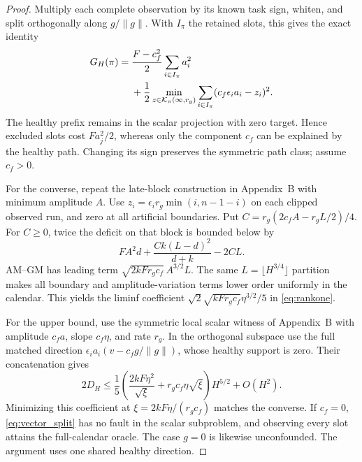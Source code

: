 \begin{proof}
Multiply each complete observation by its known task sign, whiten, and split orthogonally along $g/\|g\|$. With $I_\pi$ the retained slots, this gives the exact identity
\begin{align}
G_H(\pi)={}&\frac{F-c_f^2}{2}\sum_{i\in I_\pi}a_i^2\nonumber\\
&+\frac12\min_{z\in\mathcal K_\pi(\infty,r_g)}\sum_{i\in I_\pi}(c_f\epsilon_i a_i-z_i)^2.\label{eq:vector_split}
\end{align}
The healthy prefix remains in the scalar projection with zero target. Hence excluded slots cost $Fa_j^2/2$, whereas only the component $c_f$ can be explained by the healthy path. Changing its sign preserves the symmetric path class; assume $c_f>0$.

For the converse, repeat the late-block construction in Appendix~B with minimum amplitude $A$. Use $z_i=\epsilon_i r_g\min(i,n-1-i)$ on each clipped observed run, and zero at all artificial boundaries. Put $C=r_g(2c_f A-r_gL/2)/4$. For $C\ge0$, twice the deficit on that block is bounded below by
\begin{equation}
 FA^2d+\frac{Ck(L-d)^2}{d+k}-2CL.
\end{equation}
AM--GM has leading term $\sqrt{2kF r_gc_f}\,A^{3/2}L$. The same $L=\lfloor H^{3/4}\rfloor$ partition makes all boundary and amplitude-variation terms lower order uniformly in the calendar. This yields the liminf coefficient $\sqrt2\sqrt{kF r_gc_f}\eta^{3/2}/5$ in \eqref{eq:rankone}.

For the upper bound, use the symmetric local scalar witness of Appendix~B with amplitude $c_f a$, slope $c_f\eta$, and rate $r_g$. In the orthogonal subspace use the full matched direction $\epsilon_i a_i(v-c_fg/\|g\|)$, whose healthy support is zero. Their concatenation gives
\begin{equation}
2D_H\le\frac15\left(\frac{2kF\eta^2}{\sqrt\xi}+r_gc_f\eta\sqrt\xi\right)H^{5/2}+O(H^2).
\end{equation}
Minimizing this coefficient at $\xi=2kF\eta/(r_gc_f)$ matches the converse. If $c_f=0$, \eqref{eq:vector_split} has no fault in the scalar subproblem, and observing every slot attains the full-calendar oracle. The case $g=0$ is likewise unconfounded. The argument uses one shared healthy direction.
\end{proof}
